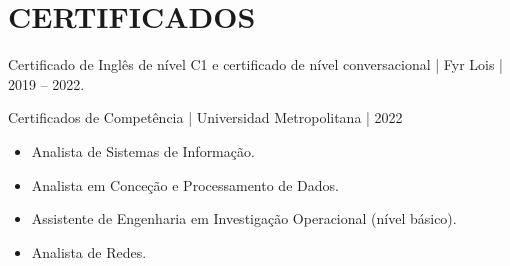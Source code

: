\documentclass[10pt,a4paper]{article}
\begin{document}
\section*{CERTIFICADOS}
Certificado de Inglês de nível C1 e certificado de nível conversacional | Fyr Lois | 2019 -- 2022.

Certificados de Competência | Universidad Metropolitana | 2022
\begin{itemize}
    \item Analista de Sistemas de Informação.
    \item Analista em Conceção e Processamento de Dados.
    \item Assistente de Engenharia em Investigação Operacional (nível básico).
    \item Analista de Redes.
\end{itemize}
\end{document}
